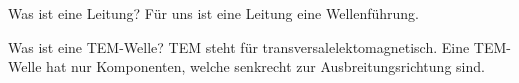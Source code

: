 
\begin{karte}{Was ist eine Leitung?}
	Für uns ist eine Leitung eine Wellenführung.\\
\end{karte}

\begin{karte}{Was ist eine TEM-Welle?}
	TEM steht für transversalelektomagnetisch. Eine TEM-Welle hat nur Komponenten, welche senkrecht zur Ausbreitungsrichtung sind.\\[10pt]
	
\end{karte}
